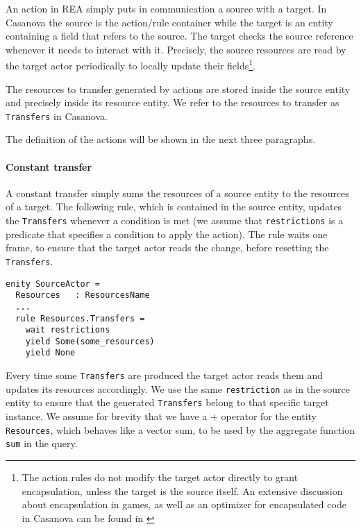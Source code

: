 An action in REA simply puts in communication a source with a target. In Casanova the source is the action/rule container while the target is an entity containing a field that refers to the source. The target checks the source reference whenever it needs to interact with it. Precisely, the source resources are read by the target actor periodically to locally update their fields\footnote{The action rules do not modify the target actor directly to grant encapsulation, unless the target is the source itself. An extensive discussion about encapsulation in games, as well as an optimizer for encapsulated code in Casanova can be found in \cite{CASANOVA2_ENCAPSULATION}}.

\noindent
The resources to transfer generated by actions are stored inside the source entity and precisely inside its resource entity. We refer to the resources to transfer as \texttt{Transfers} in Casanova.

\noindent
The definition of the actions will be shown in the next three paragraphs.

\paragraph*{Constant transfer}
A constant transfer simply sums the resources of a source entity to the resources of a target. The following rule, which is contained in the source entity, updates the \texttt{Transfers} whenever a condition is met (we assume that \texttt{restrictions} is a predicate that specifies a condition to apply the action). The rule waits one frame, to ensure that the target actor reads the change, before resetting the \texttt{Transfers}.

\begin{lstlisting}[mathescape]
enity SourceActor =
  Resources   : ResourcesName
  ...
  rule Resources.Transfers = 
    wait restrictions
    yield Some(some_resources)
    yield None
\end{lstlisting}


Every time some \texttt{Transfers} are produced the target actor reads them and updates its resources accordingly. We use the same \texttt{restriction} as in the source entity to ensure that the generated \texttt{Transfers} belong to that specific target instance. We assume for brevity that we have a + operator for the entity \texttt{Resources}, which behaves like a vector sum, to be used by the aggregate function \texttt{sum} in the query.

